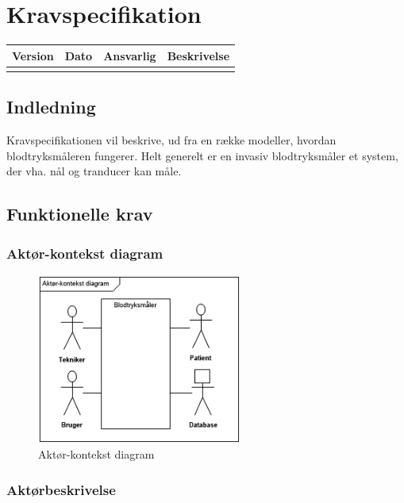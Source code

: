 \chapter{Kravspecifikation}

\begin{longtabu} to 
    Version &    Dato &    Ansvarlig &    Beskrivelse\\[-1ex]
    \midrule
\label{version_Systemark}
\end{longtabu}


\section{Indledning}
Kravspecifikationen vil beskrive, ud fra en række modeller, hvordan blodtryksmåleren fungerer. Helt generelt er en invasiv blodtryksmåler et system, der vha. nål og tranducer kan måle.


\section{Funktionelle krav}
\subsection{Aktør-kontekst diagram}

\begin{figure}[H]
	\centering
	\includegraphics[width=0.6\textwidth]{Figurer/Aktordiagram}
	\caption{Aktør-kontekst diagram}
\end{figure}


\subsection{Aktørbeskrivelse}

